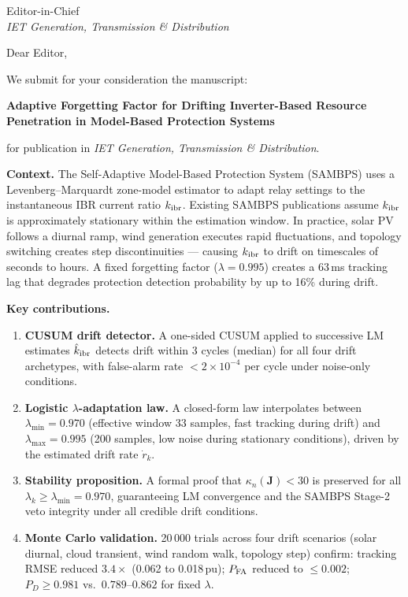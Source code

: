 \documentclass[11pt,a4paper]{letter}
\begin{document}
\begin{letter}{Editor-in-Chief\\
               \textit{IET Generation, Transmission \& Distribution}}

\opening{Dear Editor,}

We submit for your consideration the manuscript:

\begin{center}
  \textbf{Adaptive Forgetting Factor for Drifting Inverter-Based Resource
  Penetration in Model-Based Protection Systems}
\end{center}

\noindent for publication in \textit{IET Generation, Transmission \& Distribution}.

\medskip
\noindent\textbf{Context.}
The Self-Adaptive Model-Based Protection System (SAMBPS) uses a
Levenberg--Marquardt zone-model estimator to adapt relay settings to the
instantaneous IBR current ratio $k_{\rm ibr}$.  Existing SAMBPS publications
assume $k_{\rm ibr}$ is approximately stationary within the estimation window.
In practice, solar PV follows a diurnal ramp, wind generation executes rapid
fluctuations, and topology switching creates step discontinuities — causing
$k_{\rm ibr}$ to drift on timescales of seconds to hours.  A fixed forgetting
factor ($\lambda = 0.995$) creates a 63\,ms tracking lag that degrades protection
detection probability by up to 16\% during drift.

\medskip
\noindent\textbf{Key contributions.}
\begin{enumerate}
  \item \textbf{CUSUM drift detector.}
        A one-sided CUSUM applied to successive LM estimates $\hat{k}_{\rm ibr}$
        detects drift within 3 cycles (median) for all four drift archetypes,
        with false-alarm rate $< 2\!\times\!10^{-4}$ per cycle under
        noise-only conditions.
  \item \textbf{Logistic $\lambda$-adaptation law.}
        A closed-form law interpolates between $\lambda_{\min} = 0.970$
        (effective window 33 samples, fast tracking during drift) and
        $\lambda_{\max} = 0.995$ (200 samples, low noise during stationary
        conditions), driven by the estimated drift rate $\dot{r}_k$.
  \item \textbf{Stability proposition.}
        A formal proof that $\kappa_n(\mathbf{J}) < 30$ is preserved for all
        $\lambda_k \geq \lambda_{\min} = 0.970$, guaranteeing LM convergence and
        the SAMBPS Stage-2 veto integrity under all credible drift conditions.
  \item \textbf{Monte Carlo validation.}
        20\,000 trials across four drift scenarios (solar diurnal, cloud transient,
        wind random walk, topology step) confirm: tracking RMSE reduced $3.4\times$
        (0.062 to 0.018\,pu); $P_{\rm FA}$ reduced to $\leq 0.002$;
        $P_D \geq 0.981$ vs.\ $0.789$--$0.862$ for fixed $\lambda$.
\end{enumerate}


\end{letter}
\end{document}
